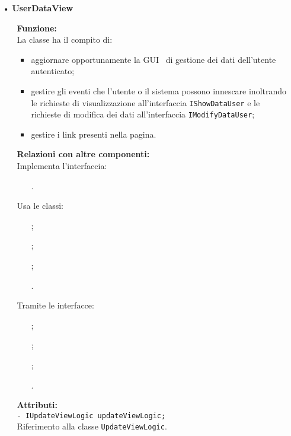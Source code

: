 {\begin{sloppypar}
{\begin{itemize}
		\item[•] \textbf{UserDataView}
		\begin{itemize}
			\item[] \textbf{Funzione:}\\
				  La classe ha il compito di:
				\begin{itemize}
					\item aggiornare opportunamente la GUI\g~ di gestione dei dati dell'utente autenticato;
					\item gestire gli eventi che l’utente o il sistema possono innescare inoltrando le richieste di visualizzazione all'interfaccia \texttt{IShowDataUser} e le richieste di modifica dei dati all'interfaccia \texttt{IModifyDataUser};
					\item gestire i link presenti nella pagina.
				\end{itemize}
				
			\item[] \textbf{Relazioni con altre componenti:}\\
				Implementa l'interfaccia:
				\begin{itemize}
					\item[] . 
				\end{itemize}
				Usa le classi:
				\begin{itemize}
					\item[] ;
					\item[] ;
					\item[] ;
					\item[] .
				\end{itemize}
				Tramite le interfacce:
				\begin{itemize}
					\item[] ;
					\item[] ;
					\item[] ;
					\item[] .
				\end{itemize}

			\item[] \textbf{Attributi:}\\
				\texttt{- IUpdateViewLogic updateViewLogic;}\\
				Riferimento alla classe \texttt{UpdateViewLogic}.\\
				

\end{itemize}
\end{itemize}}
\end{sloppypar}}
